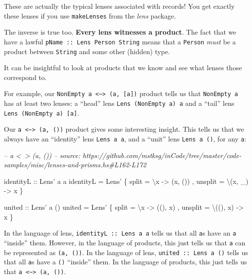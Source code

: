 \documentclass[]{article}
\newenvironment{Shaded}{}{}
\newcommand{\CommentTok}[1]{\textcolor[rgb]{0.38,0.63,0.69}{\textit{#1}}}
\newcommand{\DataTypeTok}[1]{\textcolor[rgb]{0.56,0.13,0.00}{#1}}
\newcommand{\FunctionTok}[1]{\textcolor[rgb]{0.02,0.16,0.49}{#1}}
\newcommand{\NormalTok}[1]{#1}
\newcommand{\OtherTok}[1]{\textcolor[rgb]{0.00,0.44,0.13}{#1}}
\begin{document}
These are actually the typical lenses associated with records! You get exactly
these lenses if you use \texttt{makeLenses} from the \emph{lens} package.

The inverse is true too. \textbf{Every lens witnesses a product}. The fact that
we have a lawful \texttt{pName\ ::\ Lens\textquotesingle{}\ Person\ String}
means that a \texttt{Person} \emph{must} be a product between \texttt{String}
and some other (hidden) type.

It can be insightful to look at products that we know and see what lenses those
correspond to.

For example, our
\texttt{NonEmpty\ a\ \textless{}\textasciitilde{}\textgreater{}\ (a,\ {[}a{]})}
product tells us that \texttt{NonEmpty\ a} has at least two lenses: a ``head''
lens \texttt{Lens\textquotesingle{}\ (NonEmpty\ a)\ a} and a ``tail'' lens
\texttt{Lens\textquotesingle{}\ (NonEmpty\ a)\ {[}a{]}}.

Our \texttt{a\ \textless{}\textasciitilde{}\textgreater{}\ (a,\ ())} product
gives some interesting insight. This tells us that we always have an
``identity'' lens \texttt{Lens\textquotesingle{}\ a\ a}, and a ``unit'' lens
\texttt{Lens\textquotesingle{}\ a\ ()}, for any \texttt{a}:

\begin{Shaded}
\begin{Highlighting}[]
\CommentTok{-- a <~> (a, ())}
\CommentTok{-- source: https://github.com/mstksg/inCode/tree/master/code-samples/misc/lenses-and-prisms.hs#L162-L172}

\OtherTok{identityL ::} \DataTypeTok{Lens'}\NormalTok{ a a}
\NormalTok{identityL }\FunctionTok{=} \DataTypeTok{Lens'}
\NormalTok{    \{ split   }\FunctionTok{=}\NormalTok{ \textbackslash{}x      }\OtherTok{->}\NormalTok{ (x, ())}
\NormalTok{    , unsplit }\FunctionTok{=}\NormalTok{ \textbackslash{}(x, _) }\OtherTok{->}\NormalTok{ x}
\NormalTok{    \}}

\OtherTok{united ::} \DataTypeTok{Lens'}\NormalTok{ a ()}
\NormalTok{united }\FunctionTok{=} \DataTypeTok{Lens'}
\NormalTok{    \{ split   }\FunctionTok{=}\NormalTok{ \textbackslash{}x       }\OtherTok{->}\NormalTok{ ((), x)}
\NormalTok{    , unsplit }\FunctionTok{=}\NormalTok{ \textbackslash{}((), x) }\OtherTok{->}\NormalTok{ x}
\NormalTok{    \}}
\end{Highlighting}
\end{Shaded}

In the language of lens, \texttt{identityL\ ::\ Lens\textquotesingle{}\ a\ a}
tells us that all \texttt{a}s have an \texttt{a} ``inside'' them. However, in
the language of products, this just tells us that \texttt{a} can be represented
as \texttt{(a,\ ())}. In the language of lens,
\texttt{united\ ::\ Lens\textquotesingle{}\ a\ ()} tells us that all \texttt{a}s
have a \texttt{()} ``inside'' them. In the language of products, this just tells
us that \texttt{a\ \textless{}\textasciitilde{}\textgreater{}\ (a,\ ())}.
\end{document}

